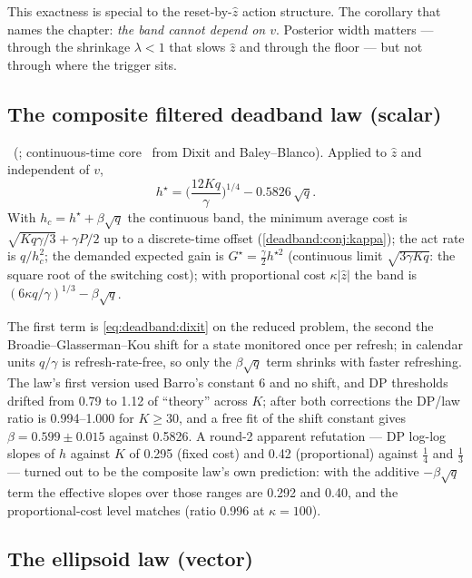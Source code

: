 This exactness is special to the reset-by-$\hat z$ action structure. The corollary that names the chapter: \emph{the band cannot depend on $v$}. Posterior width matters --- through the shrinkage $\lambda < 1$ that slows $\hat z$ and through the floor --- but not through where the trigger sits.

\subsection{The composite filtered deadband law (scalar)}

\begin{law}
\label{deadband:law:scalar}
\tagEstablished\ (; continuous-time core \tagTransported\ from Dixit and Baley--Blanco). Applied to $\hat z$ and independent of $v$,
\begin{equation}
h^\star = \Big(\frac{12Kq}{\gamma}\Big)^{1/4} - 0.5826\,\sqrt q .
\label{eq:deadband:hstar}
\end{equation}
With $h_c = h^\star + \beta\sqrt q$ the continuous band, the minimum average cost is $\sqrt{Kq\gamma/3} + \gamma P/2$ up to a discrete-time offset (\cref{deadband:conj:kappa}); the act rate is $q/h_c^2$; the demanded expected gain is $G^\star = \tfrac{\gamma}{2}h^{\star2}$ (continuous limit $\sqrt{3\gamma Kq}$: the square root of the switching cost); with proportional cost $\kappa|\hat z|$ the band is $(6\kappa q/\gamma)^{1/3} - \beta\sqrt q$.
\end{law}

The first term is \cref{eq:deadband:dixit} on the reduced problem, the second the Broadie--Glasserman--Kou shift for a state monitored once per refresh; in calendar units $q/\gamma$ is refresh-rate-free, so only the $\beta\sqrt q$ term shrinks with faster refreshing. The law's first version used Barro's constant 6 and no shift, and DP thresholds drifted from 0.79 to 1.12 of ``theory'' across $K$; after both corrections the DP/law ratio is 0.994--1.000 for $K \ge 30$, and a free fit of the shift constant gives $\beta = 0.599 \pm 0.015$ against 0.5826. A round-2 apparent refutation --- DP log-log slopes of $h$ against $K$ of 0.295 (fixed cost) and 0.42 (proportional) against $\tfrac14$ and $\tfrac13$ --- turned out to be the composite law's own prediction: with the additive $-\beta\sqrt q$ term the effective slopes over those ranges are 0.292 and 0.40, and the proportional-cost level matches (ratio 0.996 at $\kappa = 100$).

\subsection{The ellipsoid law (vector)}

